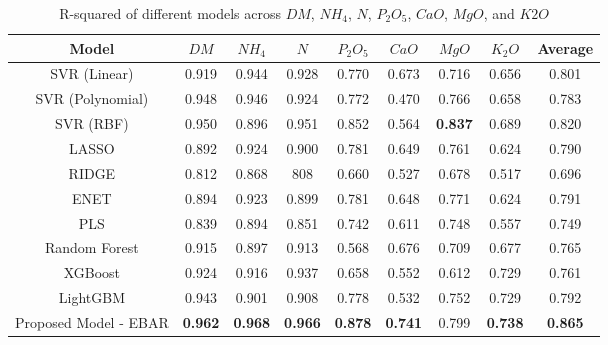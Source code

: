 \documentclass[10pt, a4paper, oneside]{article}
\begin{document}
\begin{table}[!ht]
    \small
    \centering
    \begin{center}
        \begin{tabular}{|c|c|c|c|c|c|c|c|c|}
        \hline
        \textbf{Model} & \textbf{\(DM\)} & \textbf{\(NH_4\)} & \textbf{\(N\)} & \textbf{\(P_2O_5\)} & \textbf{\(CaO\)} & \textbf{\(MgO\)} & \textbf{\(K_2O\)} & \textbf{Average} \\
        \hline
        SVR (Linear) & 0.919 & 0.944 & 0.928 & 0.770 & 0.673 & 0.716 & 0.656 & 0.801 \\
        \hline
        SVR (Polynomial) & 0.948 & 0.946 & 0.924 & 0.772 & 0.470 & 0.766 & 0.658 & 0.783 \\
        \hline
        SVR (RBF) & 0.950 & 0.896 & 0.951 & 0.852 & 0.564 & \textbf{0.837} & 0.689 & 0.820 \\
        \hline
        LASSO & 0.892 & 0.924 & 0.900 & 0.781 & 0.649 & 0.761 & 0.624 & 0.790 \\
        \hline
        RIDGE & 0.812 & 0.868 & 808 & 0.660 & 0.527 & 0.678 & 0.517 & 0.696 \\
        \hline
        ENET & 0.894 & 0.923 & 0.899 & 0.781 & 0.648 & 0.771 & 0.624 & 0.791 \\
        \hline
        PLS & 0.839 & 0.894 & 0.851 & 0.742 & 0.611 & 0.748 & 0.557 & 0.749 \\
        \hline
        Random Forest & 0.915 & 0.897 & 0.913 & 0.568 & 0.676 & 0.709 & 0.677 & 0.765 \\
        \hline
        XGBoost & 0.924 & 0.916 & 0.937 & 0.658 & 0.552 & 0.612 & 0.729 & 0.761 \\
        \hline
        LightGBM & 0.943 & 0.901 & 0.908 & 0.778 & 0.532 & 0.752 & 0.729 & 0.792 \\
        \hline
        Proposed Model - EBAR & \textbf{0.962} & \textbf{0.968} & \textbf{0.966} & \textbf{0.878} & \textbf{0.741} & 0.799 & \textbf{0.738} & \textbf{0.865} \\
    \hline
    \end{tabular}
    \caption{R-squared of different models across \(DM\), \(NH_4\), \(N\), \(P_2O_5\), \(CaO\), \(MgO\), and \(K2O\)}
    \label{tab:table4}
    \end{center}
\end{table}
\end{document}
